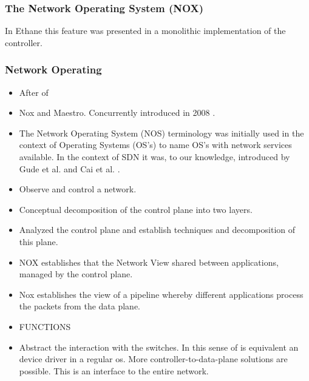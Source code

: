 \begin{itemize}



\subsubsection{The Network Operating System (NOX)}

In Ethane this
feature was presented in a monolithic  implementation of the controller.

\subsubsection{Network Operating}

\begin{itemize}
\item After \gls{of} 
\item Nox and Maestro. Concurrently introduced in 2008 . 
\item The Network Operating System (NOS) terminology  was initially used in the
context of Operating Systems (OS's) to name OS's with network services available. In the
context of SDN it was, to our knowledge,
introduced by Gude et al. \cite{Gude:2008jd} and
Cai et al. \cite{Z.-Cai:2008fk}.
\item Observe and control a network. 
\item Conceptual decomposition of the control plane into two layers. 
\item Analyzed the control plane and establish techniques and decomposition of this plane. 
\item NOX establishes that the Network View shared between applications, managed by the control plane. 

\item Nox establishes the view of a pipeline whereby different applications process the packets from the data plane. 


\item FUNCTIONS
\item Abstract the interaction with the switches. In this sense \gls{of} is equivalent an device driver in a regular \gls{os}. More controller-to-data-plane solutions are possible.  This is an interface to the entire network. 


\end{itemize}
\end{itemize}
